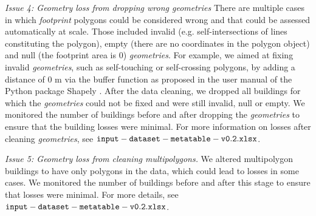 \documentclass[fleqn,10pt]{wlscirep}
\begin{document}
\medskip \noindent \textit{Issue 4: Geometry loss from dropping wrong geometries} \hspace{0.1cm} 
There are multiple cases in which \textit{footprint} polygons could be considered wrong and that could be assessed automatically at scale. Those included invalid (e.g. self-intersections of lines constituting the polygon), empty (there are no coordinates in the polygon object) and null (the footprint area is 0) \textit{geometries}. 
For example, we aimed at fixing invalid \textit{geometries}, such as self-touching or self-crossing polygons, by adding a distance of 0 m via the buffer function as proposed in the user manual of the Python package Shapely \cite{gillies_2021}. After the data cleaning, we dropped all buildings for which the \textit{geometries} could not be fixed and were still invalid, null or empty. We monitored the number of buildings before and after dropping the \textit{geometries} to ensure that the building losses were minimal. For more information on losses after cleaning \textit{geometries}, see ${\tt input-dataset-metatable-v0.2.xlsx}$.

\medskip \noindent \textit{Issue 5: Geometry loss from cleaning multipolygons.} \hspace{0.1cm} We altered multipolygon buildings to have only polygons in the data, which could lead to losses in some cases. We monitored the number of buildings before and after this stage to ensure that losses were minimal. For more details, see ${\tt input-dataset-metatable-v0.2.xlsx}$.
\end{document}

